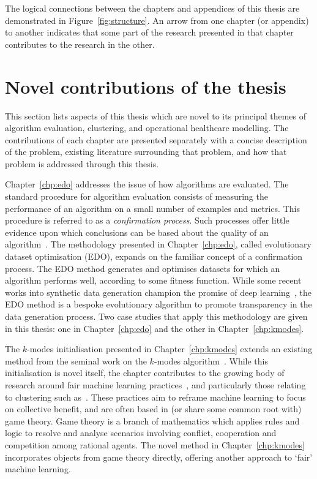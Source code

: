 The logical connections between the chapters and appendices of this thesis are
demonstrated in Figure~\ref{fig:structure}. An arrow from one chapter (or
appendix) to another indicates that some part of the research presented in that
chapter contributes to the research in the other. 


\section{Novel contributions of the thesis}\label{sec:novel}

This section lists aspects of this thesis which are novel to its principal
themes of algorithm evaluation, clustering, and operational healthcare
modelling. The contributions of each chapter are presented separately with a
concise description of the problem, existing literature surrounding that
problem, and how that problem is addressed through this thesis.

Chapter~\ref{chp:edo} addresses the issue of how algorithms are evaluated. The
standard procedure for algorithm evaluation consists of measuring the
performance of an algorithm on a small number of examples and metrics. This
procedure is referred to as a \emph{confirmation process}. Such processes offer
little evidence upon which conclusions can be based about the quality of an
algorithm~\cite{Parker2020}. The methodology presented in Chapter~\ref{chp:edo},
called evolutionary dataset optimisation (EDO), expands on the familiar concept
of a confirmation process. The EDO method generates and optimises datasets for
which an algorithm performs well, according to some fitness function. While some
recent works into synthetic data generation champion the promise of deep
learning~\cite{Avino2018,Park2018,Torfi2020}, the EDO method is a bespoke
evolutionary algorithm to promote transparency in the data generation process.
Two case studies that apply this methodology are given in this thesis: one in
Chapter~\ref{chp:edo} and the other in Chapter~\ref{chp:kmodes}.

The \(k\)-modes initialisation presented in Chapter~\ref{chp:kmodes} extends an
existing method from the seminal work on the \(k\)-modes
algorithm~\cite{Huang1998}. While this initialisation is novel itself, the
chapter contributes to the growing body of research around fair machine learning
practices~\cite{Barocas2019,CorbettDavies2018}, and particularly those relating
to clustering such as~\cite{Ahmadian2020,Chen2019}. These practices aim to
reframe machine learning to focus on collective benefit, and are often based in
(or share some common root with) game theory. Game theory is a branch of
mathematics which applies rules and logic to resolve and analyse scenarios
involving conflict, cooperation and competition among rational agents. The novel
method in Chapter~\ref{chp:kmodes} incorporates objects from game theory
directly, offering another approach to `fair' machine learning.

